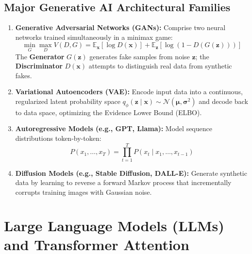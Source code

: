 \subsection{Major Generative AI Architectural Families}
\begin{enumerate}[label=\bfseries\alph*.]
    \item \textbf{Generative Adversarial Networks (GANs):} Comprise two neural networks trained simultaneously in a minimax game:
    \begin{equation}
    \min_G \max_D V(D, G) = \mathbb{E}_{\mathbf{x}}[\log D(\mathbf{x})] + \mathbb{E}_{\mathbf{z}}[\log(1 - D(G(\mathbf{z})))]
    \end{equation}
    The \textbf{Generator} $G(\mathbf{z})$ generates fake samples from noise $\mathbf{z}$; the \textbf{Discriminator} $D(\mathbf{x})$ attempts to distinguish real data from synthetic fakes.
    \item \textbf{Variational Autoencoders (VAE):} Encode input data into a continuous, regularized latent probability space $q_\phi(\mathbf{z} \mid \mathbf{x}) \sim \mathcal{N}(\boldsymbol{\mu}, \boldsymbol{\sigma}^2)$ and decode back to data space, optimizing the Evidence Lower Bound (ELBO).
    \item \textbf{Autoregressive Models (e.g., GPT, Llama):} Model sequence distributions token-by-token:
    \begin{equation}
    P(x_1, \dots, x_T) = \prod_{t=1}^T P(x_t \mid x_1, \dots, x_{t-1})
    \end{equation}
    \item \textbf{Diffusion Models (e.g., Stable Diffusion, DALL-E):} Generate synthetic data by learning to reverse a forward Markov process that incrementally corrupts training images with Gaussian noise.
\end{enumerate}


\section{Large Language Models (LLMs) and Transformer Attention}
\label{sec:llms_transformers}

